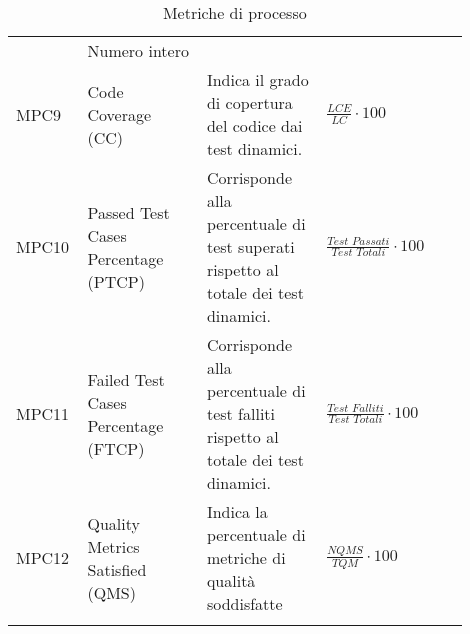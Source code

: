 \begin{longtable}{P{0.1\linewidth}P{0.25\linewidth}P{0.25\linewidth}P{0.30\linewidth}}
            & Numero intero		\\[4pt]
	    	MPC9 & Code Coverage (CC) 
            & Indica il grado di copertura del codice dai test dinamici.
            & $\frac{LCE}{LC} \cdot 100$		\\[4pt]
            MPC10 
            & Passed Test Cases Percentage (PTCP) 
            & Corrisponde alla percentuale di test superati rispetto al totale dei test dinamici.
            & $\frac{\textit{Test Passati}}{\textit{Test Totali}} \cdot 100$	\\[4pt]
	    	MPC11 
            & Failed Test Cases Percentage (FTCP) 
            & Corrisponde alla percentuale di test falliti rispetto al totale dei test dinamici.
            & $\frac{\textit{Test Falliti}}{\textit{Test Totali}} \cdot 100$ \\[4pt]
            MPC12 
            & Quality Metrics Satisfied (QMS) 
            & Indica la percentuale di metriche di qualità soddisfatte
            & $\frac{NQMS}{TQM} \cdot 100$		\\[4pt]
    \caption{Metriche di processo}
\end{longtable}
\setlength\extrarowheight{0pt}